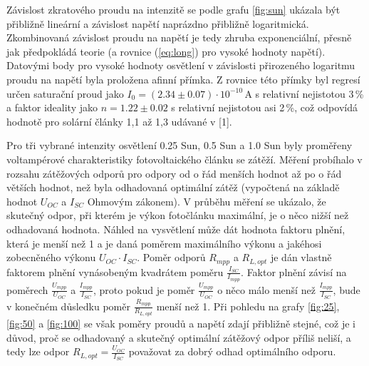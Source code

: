 \documentclass{../concepts/prepareprotokol} %
\begin{document}
Závislost zkratového proudu na intenzitě se podle grafu \ref{fig:sun} ukázala být přibližně lineární a závislost napětí naprázdno přibližně logaritmická. Zkombinovaná závislost proudu na napětí je tedy zhruba exponenciální, přesně jak předpokládá teorie (a rovnice (\ref{eq:long}) pro vysoké hodnoty napětí). Datovými body pro vysoké hodnoty osvětlení v závislosti přirozeného logaritmu proudu na napětí byla proložena afinní přímka. Z rovnice této přímky byl regresí určen saturační proud jako $I_0 = (2.34 \pm 0.07) \cdot 10^{-10} \, \si{\ampere}$ s relativní nejistotou 3\,\% a faktor ideality jako $n = 1.22 \pm 0.02$ s relativní nejistotou asi 2\,\%, což odpovídá hodnotě pro solární články 1,1 až 1,3 udávané v [1]. 

Pro tři vybrané intenzity osvětlení 0.25 Sun, 0.5 Sun a 1.0 Sun byly proměřeny voltampérové charakteristiky fotovoltaického článku se zátěží. Měření probíhalo v rozsahu zátěžových odporů pro odpory od o řád menších hodnot až po o řád větších hodnot, než byla odhadovaná optimální zátěž (vypočtená na základě hodnot $U_{OC}$ a $I_{SC}$ Ohmovým zákonem). V průběhu měření se ukázalo, že skutečný odpor, při kterém je výkon fotočlánku maximální, je o něco nižší než odhadovaná hodnota. Náhled na vysvětlení může dát hodnota faktoru plnění, která je menší než 1 a je daná poměrem maximálního výkonu a jakéhosi zobecněného výkonu $U_{OC} \cdot I_{SC}$. Poměr odporů $R_{mpp}$ a $R_{L,opt}$ je dán vlastně faktorem plnění vynásobeným kvadrátem poměru $\frac{I_{SC}}{I_{mpp}}$. Faktor plnění závisí na poměrech $\frac{U_{mpp}}{U_{OC}}$ a $\frac{I_{mpp}}{I_{SC}}$, proto pokud je poměr $\frac{U_{mpp}}{U_{OC}}$ o něco málo menší než $\frac{I_{mpp}}{I_{SC}}$, bude v konečném důsledku poměr $\frac{R_{mpp}}{R_{L,opt}}$ menší než 1. Při pohledu na grafy \ref{fig:25}, \ref{fig:50} a \ref{fig:100} se však poměry proudů a napětí zdají přibližně stejné, což je i důvod, proč se odhadovaný a skutečný optimální zátěžový odpor příliš neliší, a tedy lze odpor $R_{L,opt} = \frac{U_{OC}}{I_{SC}}$ považovat za dobrý odhad optimálního odporu.
\end{document}
